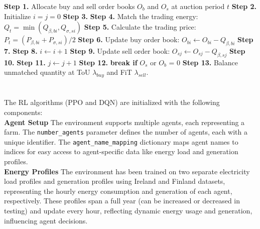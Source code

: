 \documentclass[preprint,12pt]{elsarticle}
\begin{document}
\begin{algorithm}
\caption{Market Clearing Algorithm}
\label{auction}
\begin{algorithmic}
\State \textbf{Step 1.} Allocate buy and sell order books $O_b$ and $O_s$ at auction period $t$
\State \textbf{Step 2.} Initialize $i = j = 0$
\State \textbf{Step 3.} 
\State \textbf{Step 4.} Match the trading energy: $Q_t = \min(Q_{\beta,bi}, Q_{\sigma,si})$
\State \textbf{Step 5.} Calculate the trading price: $P_t = (P_{\beta,bi} + P_{\sigma,si})/2$
\State \textbf{Step 6.} Update buy order book: $O_{bi} \leftarrow O_{bi} - Q_{\beta,bi}$
\State \textbf{Step 7.} 
\State \textbf{Step 8.} $i \leftarrow i + 1$
\EndIf
\State \textbf{Step 9.} Update sell order book: $O_{sj} \leftarrow O_{sj} - Q_{\beta,sj}$
\State \textbf{Step 10.} 
\State \textbf{Step 11.} $j \leftarrow j + 1$
\EndIf
\State \textbf{Step 12.} \textbf{break if} $O_s$ or $O_b$ = 0
\EndWhile
\State \textbf{Step 13.} Balance unmatched quantity at ToU $\lambda_{buy}$ and FiT $\lambda_{sell}$.
\end{algorithmic}
\end{algorithm}



\section{}
\label{agentsetup}


The RL algorithms (PPO and DQN) are initialized with the following components:\\

\textbf{Agent Setup}
The environment supports multiple agents, each representing a farm. The \texttt{number\_agents} parameter defines the number of agents, each with a unique identifier. The \texttt{agent\_name\_mapping} dictionary maps agent names to indices for easy access to agent-specific data like energy load and generation profiles.\\

\textbf{Energy Profiles}
The environment has been trained on two separate electricity load profiles and generation profiles using Ireland and Finland datasets, representing the hourly energy consumption and generation of each agent, respectively. These profiles span a full year (can be increased or decreased in testing) and update every hour, reflecting dynamic energy usage and generation, influencing agent decisions.\\
\end{document}
